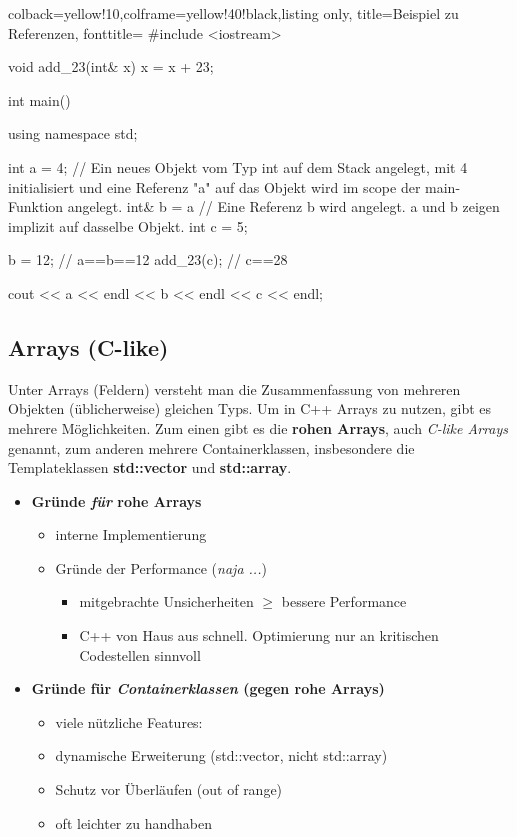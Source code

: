 \documentclass[a4paper]{report}
\begin{document}
\begin{tcblisting}{colback=yellow!10,colframe=yellow!40!black,listing only,
		title=Beispiel zu Referenzen, fonttitle=\bfseries}
	#include <iostream>
	
	void add_23(int& x){
		x = x + 23;
	}
	
	int main(){
		using namespace std;
		
		int a = 4; // Ein neues Objekt vom Typ int auf dem Stack angelegt, mit 4 initialisiert und eine Referenz "a" auf das Objekt wird im scope der main-Funktion angelegt.
		int& b = a // Eine Referenz b wird angelegt. a und b zeigen implizit auf dasselbe Objekt.
		int c = 5;
		
		b = 12; // a==b==12
		add_23(c); // c==28
		
		cout << a << endl << b << endl << c << endl; 
	}
\end{tcblisting}


\subsection{Arrays (C-like)}
Unter Arrays (Feldern) versteht man die Zusammenfassung von mehreren Objekten (üblicherweise) gleichen Typs. Um in C++ Arrays zu nutzen, gibt es mehrere Möglichkeiten. Zum einen gibt es die \textbf{rohen Arrays}, auch \textit{C-like Arrays} genannt, zum anderen mehrere Containerklassen, insbesondere die Templateklassen \textbf{std::vector} und \textbf{std::array}.

\begin{itemize}
	\item \textbf{Gründe \textit{für} rohe Arrays}
	\begin{itemize}
		\item interne Implementierung
		\item Gründe der Performance (\textit{naja ...})
			\begin{itemize}
				\item mitgebrachte Unsicherheiten $\geq$ bessere Performance
				\item C++ von Haus aus schnell. Optimierung nur an kritischen Codestellen sinnvoll
			\end{itemize}
	\end{itemize}
	\item \textbf{Gründe für \textit{Containerklassen} (gegen rohe Arrays)}
	\begin{itemize}
		\item viele nützliche Features:
		\item dynamische Erweiterung (std::vector, nicht std::array)
		\item Schutz vor Überläufen (out of range)
		\item oft leichter zu handhaben 
	\end{itemize}
\end{itemize}
\end{document}
